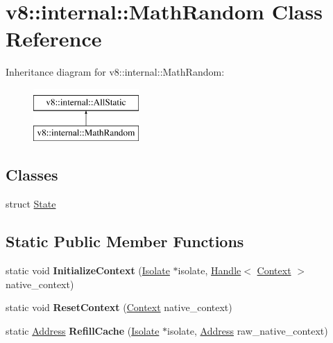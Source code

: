 \hypertarget{classv8_1_1internal_1_1MathRandom}{}\section{v8\+:\+:internal\+:\+:Math\+Random Class Reference}
\label{classv8_1_1internal_1_1MathRandom}
Inheritance diagram for v8\+:\+:internal\+:\+:Math\+Random\+:\begin{figure}[H]
\begin{center}
\leavevmode
\includegraphics[height=2.000000cm]{classv8_1_1internal_1_1MathRandom}
\end{center}
\end{figure}
\subsection*{Classes}
\begin{DoxyCompactItemize}
\item 
struct \mbox{\hyperlink{structv8_1_1internal_1_1MathRandom_1_1State}{State}}
\end{DoxyCompactItemize}
\subsection*{Static Public Member Functions}
\begin{DoxyCompactItemize}
\item 
\mbox{\label{classv8_1_1internal_1_1MathRandom_aeb6b2adcca994b869fcee45abf879088}} 
static void {\bfseries Initialize\+Context} (\mbox{\hyperlink{classv8_1_1internal_1_1Isolate}{Isolate}} $\ast$isolate, \mbox{\hyperlink{classv8_1_1internal_1_1Handle}{Handle}}$<$ \mbox{\hyperlink{classv8_1_1internal_1_1Context}{Context}} $>$ native\+\_\+context)
\item 
\mbox{\label{classv8_1_1internal_1_1MathRandom_a8af32f3aa56a111debfca4bd66f79aa6}} 
static void {\bfseries Reset\+Context} (\mbox{\hyperlink{classv8_1_1internal_1_1Context}{Context}} native\+\_\+context)
\item 
\mbox{\label{classv8_1_1internal_1_1MathRandom_a0fdcdc60fa79ec3355de0fabd3b8758a}} 
static \mbox{\hyperlink{classuintptr__t}{Address}} {\bfseries Refill\+Cache} (\mbox{\hyperlink{classv8_1_1internal_1_1Isolate}{Isolate}} $\ast$isolate, \mbox{\hyperlink{classuintptr__t}{Address}} raw\+\_\+native\+\_\+context)
\end{DoxyCompactItemize}
